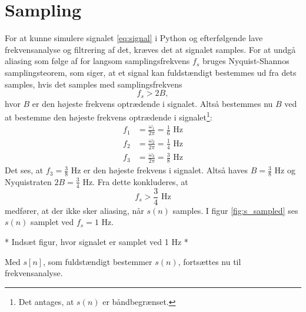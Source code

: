\section{Sampling}
For at kunne simulere signalet \eqref{eq:signal} i Python og efterfølgende lave frekvensanalyse og filtrering af det, kræves det at signalet samples. 
For at undgå aliasing som følge af for langsom samplingsfrekvens $f_s$ bruges Nyquist-Shannos samplingsteorem, som siger, at et signal kan fuldstændigt bestemmes ud fra dets samples, hvis det samples med samplingsfrekvens
\begin{equation}
f_s>2B,
\end{equation}
hvor $B$ er den højeste frekvens optrædende i signalet. Altså bestemmes nu $B$ ved at bestemme den højeste frekvens optrædende i signalet\footnote{Det antages, at $s(n)$ er båndbegrænset.}:
\begin{align*}
f_1&=\frac{\omega_1}{2\pi}=\frac{1}{6}\text{ Hz}\\
f_2&=\frac{\omega_2}{2\pi}=\frac{1}{4}\text{ Hz}\\
f_3&=\frac{\omega_3}{2\pi}=\frac{3}{8}\text{ Hz}
\end{align*}
Det ses, at $f_3=\frac{3}{8}$ Hz er den højeste frekvens i signalet. Altså haves $B=\frac{3}{8}$ Hz og Nyquistraten $2B=\frac{3}{4}$ Hz. Fra dette konkluderes, at
\begin{equation}
f_s>\frac{3}{4}\text{ Hz}
\end{equation}
medfører, at der ikke sker aliasing, når $s(n)$ samples. I figur \ref{fig:s_sampled} ses $s(n)$ samplet ved $f_s=1$ Hz.
\begin{center}
* Indsæt figur, hvor signalet er samplet ved 1 Hz *
\end{center}
Med $s[n]$, som fuldstændigt bestemmer $s(n)$, fortsættes nu til frekvensanalyse.